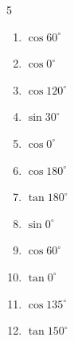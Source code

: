 \begin{multicols}{5}
\begin{enumerate}

  \item $\displaystyle \cos{60^\circ}$


  \item $\displaystyle \cos{0^\circ}$

        \phantom{$\displaystyle =1$}

  \item $\displaystyle \cos{120^\circ}$


  \item $\displaystyle \sin{30^\circ}$


  \item $\displaystyle \cos{0^\circ}$

        \phantom{$\displaystyle =1$}

  \item $\displaystyle \cos{180^\circ}$

        \phantom{$\displaystyle =-1$}

  \item $\displaystyle \tan{180^\circ}$

        \phantom{$\displaystyle =0$}

\columnbreak %

  \item $\displaystyle \sin{0^\circ}$

        \phantom{$\displaystyle =0$}

  \item $\displaystyle \cos{60^\circ}$


  \item $\displaystyle \tan{0^\circ}$

        \phantom{$\displaystyle =0$}

  \item $\displaystyle \cos{135^\circ}$


  \item $\displaystyle \tan{150^\circ}$



\end{enumerate}
\end{multicols}
